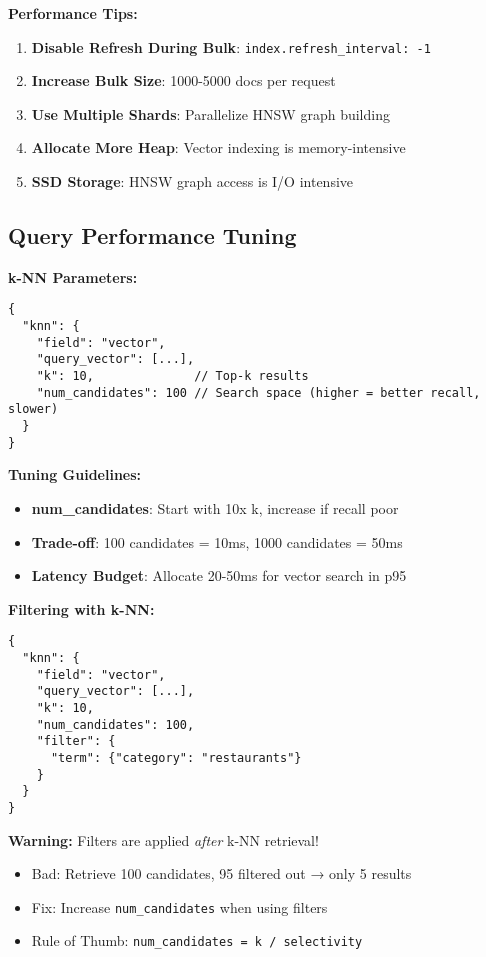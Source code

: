 \documentclass[10pt]{article}
\begin{document}
\textbf{Performance Tips:}
\begin{enumerate}
\item \textbf{Disable Refresh During Bulk}: \texttt{index.refresh\_interval: -1}
\item \textbf{Increase Bulk Size}: 1000-5000 docs per request
\item \textbf{Use Multiple Shards}: Parallelize HNSW graph building
\item \textbf{Allocate More Heap}: Vector indexing is memory-intensive
\item \textbf{SSD Storage}: HNSW graph access is I/O intensive
\end{enumerate}

\subsection{Query Performance Tuning}

\textbf{k-NN Parameters:}
\begin{lstlisting}
{
  "knn": {
    "field": "vector",
    "query_vector": [...],
    "k": 10,              // Top-k results
    "num_candidates": 100 // Search space (higher = better recall, slower)
  }
}
\end{lstlisting}

\textbf{Tuning Guidelines:}
\begin{itemize}
\item \textbf{num\_candidates}: Start with 10x k, increase if recall poor
\item \textbf{Trade-off}: 100 candidates = 10ms, 1000 candidates = 50ms
\item \textbf{Latency Budget}: Allocate 20-50ms for vector search in p95
\end{itemize}

\textbf{Filtering with k-NN:}
\begin{lstlisting}
{
  "knn": {
    "field": "vector",
    "query_vector": [...],
    "k": 10,
    "num_candidates": 100,
    "filter": {
      "term": {"category": "restaurants"}
    }
  }
}
\end{lstlisting}

\textbf{Warning:} Filters are applied \textit{after} k-NN retrieval!
\begin{itemize}
\item Bad: Retrieve 100 candidates, 95 filtered out → only 5 results
\item Fix: Increase \texttt{num\_candidates} when using filters
\item Rule of Thumb: \texttt{num\_candidates = k / selectivity}
\end{itemize}
\end{document}
